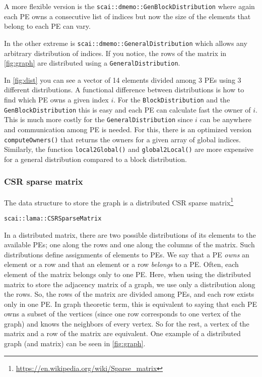 \documentclass[a4paper,10pt]{article}
\newcommand{\MI}[1]{\texttt{#1}}
\begin{document}
A more flexible version is the \MI{scai::dmemo::GenBlockDistribution} where again each PE owns a 
consecutive list of indices but now the size of the elements that belong to each PE can vary.

In the other extreme is \MI{scai::dmemo::GeneralDistribution} which allows any arbitrary distribution
of indices. If you notice, the rows of the matrix in \cref{fig:graph} are distributed using a
\MI{GeneralDistribution}. 

In \cref{fig:dist} you can see a vector of 14 elements divided among 3 PEs using 3 different 
distributions. A functional difference between distributions is how to find which PE owns a given
index $i$. For the \MI{BlockDistribution} and the \MI{GenBlockDistribution} this is easy and each
PE can calculate fast the owner of $i$. This is much more costly for the \MI{GeneralDistribution} 
since $i$ can be anywhere and communication among PE is needed.
For this, there is an optimized version \MI{computeOwners()} that returns the owners for a given array of 
global indices. Similarly, the function \MI{local2Global()} and \MI{global2Local()} are more expensive
for a general distribution compared to a block distribution.


\subsubsection*{CSR sparse matrix}

The data structure to store the graph is a distributed CSR sparse matrix\footnote{\url{https://en.wikipedia.org/wiki/Sparse_matrix}} 
\begin{verbatim}
scai::lama::CSRSparseMatrix
\end{verbatim}

In a distributed matrix, there are two possible distributions of its elements to the available
PEs; one along the rows and one along the columns of the matrix.
Such distributions define assignments of elements to PEs. We say that a PE \emph{owns} an element or a row
and that an element or a row \emph{belongs} to a PE. Often, each element of the matrix belongs only to one PE.
Here, when using the distributed matrix to store the adjacency matrix of a graph, we use only a distribution 
along the rows. So, the rows of the matrix are divided among PEs, and each row exists only in one PE.
In graph theoretic term, this is equivalent to saying that each PE owns a subset of the vertices (since
one row corresponds to one vertex of the graph) and knows the neighbors of every vertex. 
So for the rest, a vertex of the matrix and a row of the matrix are equivalent.
One example of a distributed graph (and matrix) can be seen in \cref{fig:graph}.
\end{document}
